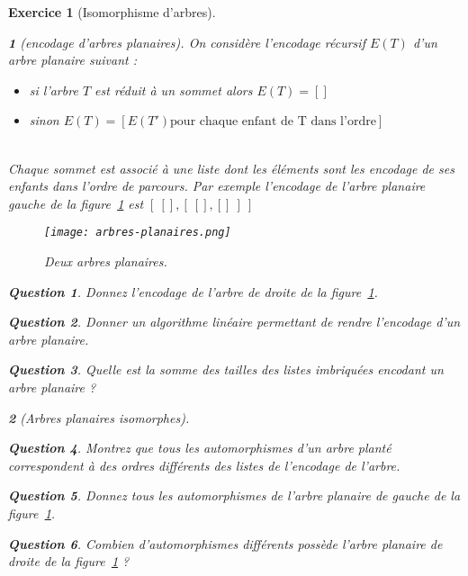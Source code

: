 \documentclass{article}
\theoremstyle{exostyle}
\newtheorem{exo}{Exercice}
\theoremstyle{partiestyle}
\newtheorem{partie}{}[exo]
\theoremstyle{questionstyle}
\newtheorem{questionpartie}{Question}[partie]
\begin{document}
\begin{exo}[Isomorphisme d'arbres]
\begin{partie}[encodage d'arbres planaires]
	On considère l'encodage récursif $E(T)$ d'un arbre planaire suivant :

	\begin{itemize}
		\item si l'arbre $T$ est réduit à un sommet alors $E(T) = []$
		\item sinon $E(T) = [E(T') \text{pour chaque enfant de T dans l'ordre}]$ 
	\end{itemize}
	~\\

	Chaque sommet est associé à une liste dont les éléments sont les encodage de ses enfants dans l'ordre de parcours.
 Par exemple l'encodage de l'arbre planaire gauche de la figure~\ref{arbres-planaires} est $[\: [], [\: [], []\:]\:]$

	\begin{figure}[h!]
		\vspace{1cm}
		\begin{center}
			\texttt{[image: arbres-planaires.png]}
		\end{center}
		\caption{Deux arbres planaires.\label{arbres-planaires}}
	\end{figure}
	\begin{questionpartie}
		Donnez l'encodage de l'arbre de droite de la figure~\ref{arbres-planaires}.
	\end{questionpartie}
	\begin{questionpartie}
		Donner un algorithme linéaire permettant de rendre l'encodage d'un arbre planaire.
	\end{questionpartie}
	\begin{questionpartie}
		Quelle est la somme des tailles des listes imbriquées encodant un arbre planaire ?
	\end{questionpartie}

\end{partie}
	\begin{partie}[Arbres planaires isomorphes]
	\begin{questionpartie}
		Montrez que tous les automorphismes d'un arbre planté correspondent à des ordres différents des listes de l'encodage de l'arbre.
	\end{questionpartie}
	\begin{questionpartie}
		Donnez tous les automorphismes de l'arbre planaire de gauche de la figure~\ref{arbres-planaires}.
	\end{questionpartie}
	\begin{questionpartie}
		Combien d'automorphismes différents possède l'arbre planaire de droite de la figure~\ref{arbres-planaires} ?
	\end{questionpartie}


\end{partie}
\end{exo}
\end{document}
